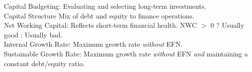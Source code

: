 \documentclass{letter}
\newcommand{\textib}[1]{\textit{\textbf{{#1}}}}
\begin{document}
Capital Budgeting: Evaluating and selecting long-term investments. \\
Capital Structure Mix of debt and equity to finance operations. \\
Net Working Capital: Reflects short-term financial health. NWC $>$ 0 ? Usually good : Usually bad. \\
Internal Growth Rate: Maximum growth rate \textit{without} EFN. \\
Sustainable Growth Rate: Maximum growth rate \textit{without} EFN \textit{and} maintaining a constant debt/equity ratio. \\
\end{document}
